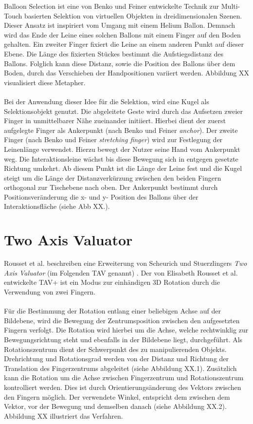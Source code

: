 Balloon Selection ist eine von Benko und Feiner \cite{benko:2007} entwickelte Technik zur Multi-Touch basierten Selektion von virtuellen Objekten in dreidimensionalen Szenen. Dieser Ansatz ist inspiriert vom Umgang mit einem Helium Ballon. Demnach wird das Ende der Leine eines solchen Ballons mit einem Finger auf den Boden gehalten. Ein zweiter Finger fixiert die Leine an einem anderen Punkt auf dieser Ebene. Die Länge des fixierten Stückes bestimmt die Aufstiegsdistanz des Ballons. Folglich kann diese Distanz, sowie die Position des Ballons über dem Boden, durch das Verschieben der Handpositionen variiert werden. Abbildung XX visualisiert diese Metapher.
\\\\
Bei der Anwendung dieser Idee für die Selektion, wird eine Kugel als Selektionsobjekt genutzt. Die abgeleitete Geste wird durch das Aufsetzen zweier Finger in unmittelbarer Nähe zueinander initiiert. Hierbei dient der zuerst aufgelegte Finger als Ankerpunkt (nach Benko und Feiner \emph{anchor}). Der zweite Finger (nach Benko und Feiner \emph{stretching finger}) wird zur Festlegung der Leinenlänge verwendet. Hierzu bewegt der Nutzer seine Hand vom Ankerpunkt weg. Die Interaktionsleine wächst bis diese Bewegung sich in entgegen gesetzte Richtung umkehrt. Ab diesem Punkt ist die Länge der Leine fest und die Kugel steigt um die Länge der Distanzverkürzung zwischen den beiden Fingern orthogonal zur Tischebene nach oben. Der Ankerpunkt bestimmt durch Positionsveränderung die x- und y- Position des Ballons über der Interaktionsfläche (siehe Abb XX.).


\section{Two Axis Valuator}
\label{sec:related_two_axis_valuator}

Rousset et al. beschreiben eine Erweiterung von Scheurich und Stuerzlingers \emph{Two Axis Valuator} (im Folgenden TAV genannt) \cite{scheurich:2013,rousset:2014}. Der von Elisabeth Rousset et al. entwickelte TAV+ ist ein Modus zur einhändigen 3D Rotation durch die Verwendung von zwei Fingern. 
\\\\
Für die Bestimmung der Rotation entlang einer beliebigen Achse auf der Bildebene, wird die Bewegung der Zentrumsposition zwischen den aufgesetzten Fingern verfolgt. Die Rotation wird hierbei um die Achse, welche rechtwinklig zur Bewegungsrichtung steht und ebenfalls in der Bildebene liegt, durchgeführt. Als Rotationszentrum dient der Schwerpunkt des zu manipulierenden Objekts. Drehrichtung und Rotationsgrad werden von der Distanz und Richtung der Translation des Fingerzentrums abgeleitet (siehe Abbildung XX.1). Zusätzlich kann die Rotation um die Achse zwischen Fingerzentrum und Rotationszentrum kontrolliert werden. Dies ist durch Orientierungsänderung des Vektors zwischen den Fingern möglich. Der verwendete Winkel, entspricht dem zwischen dem Vektor, vor der Bewegung und demselben danach (siehe Abbildung XX.2). Abbildung XX illustriert das Verfahren.


